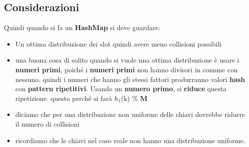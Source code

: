 \subsection{Considerazioni}
Quindi quando si fa un \textbf{HashMap} si deve guardare:
\begin{itemize}
    \item Un ottima distribuzione dei slot quindi avere meno collisioni possibili
    \item una buona cosa di solito quando si vuole una ottima distribuzione è usare i \textbf{numeri primi}, poiché i \textbf{numeri primi} non hanno divisori in comune con nessuno. quindi i numeri che hanno gli stessi fattori produrranno valori \textbf{hash} con \textbf{pattern ripetitivi}. Usando un \textbf{numero primo}, si \textbf{riduce} questa ripetizione. questo perché si farà $h_1$(k) \% \textbf{M}
    \item  diciamo che per una distribuzione non uniforme delle chiavi dovrebbe ridurre il numero di collisioni
    \item ricordiamo che le chiavi nel caso reale non hanno una distribuzione uniforme.
\end{itemize}